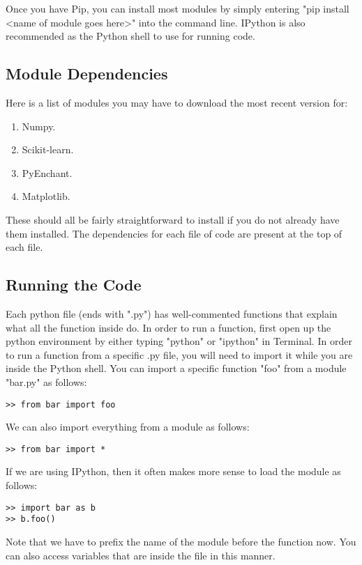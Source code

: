 \documentclass[12pt, usenames]{article}
\theoremstyle{definition}
\theoremstyle{definition}
\theoremstyle{definition}
\begin{document}
Once you have Pip, you can install most modules by simply entering "pip install <name of module goes here>" into the command line. IPython is also recommended as the Python shell to use for running code. 

\subsection{Module Dependencies}

Here is a list of modules you may have to download the most recent version for:

\begin{enumerate}

\item Numpy.

\item Scikit-learn. 

\item PyEnchant.

\item Matplotlib.

\end{enumerate}

These should all be fairly straightforward to install if you do not already have them installed. The dependencies for each file of code are present at the top of each file. 

\subsection{Running the Code}

Each python file (ends with ".py") has well-commented functions that explain what all the function inside do. In order to run a function, first open up the python environment by either typing "python" or "ipython" in Terminal. In order to run a function from a specific .py file, you will need to import it while you are inside the Python shell. You can import a specific function "foo" from a module "bar.py" as follows:
\begin{verbatim}
>> from bar import foo
\end{verbatim}
We can also import everything from a module as follows: 
\begin{verbatim}
>> from bar import *
\end{verbatim}
If we are using IPython, then it often makes more sense to load the module as follows:
\begin{verbatim}
>> import bar as b
>> b.foo()
\end{verbatim}
Note that we have to prefix the name of the module before the function now. You can also access
variables that are inside the file in this manner. 
\end{document}
